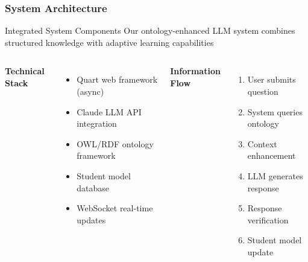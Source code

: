 \documentclass{beamer}
\begin{document}
\begin{frame}
\frametitle{System Architecture}

\begin{block}{Integrated System Components}
Our ontology-enhanced LLM system combines structured knowledge with adaptive learning capabilities
\end{block}

\begin{columns}

\textbf{Technical Stack}
\begin{itemize}
    \item Quart web framework (async)
    \item Claude LLM API integration
    \item OWL/RDF ontology framework
    \item Student model database
    \item WebSocket real-time updates
\end{itemize}

\textbf{Information Flow}
\begin{enumerate}
    \item User submits question
    \item System queries ontology
    \item Context enhancement
    \item LLM generates response
    \item Response verification
    \item Student model update
\end{enumerate}

\end{columns}
\end{frame}
\end{document}
